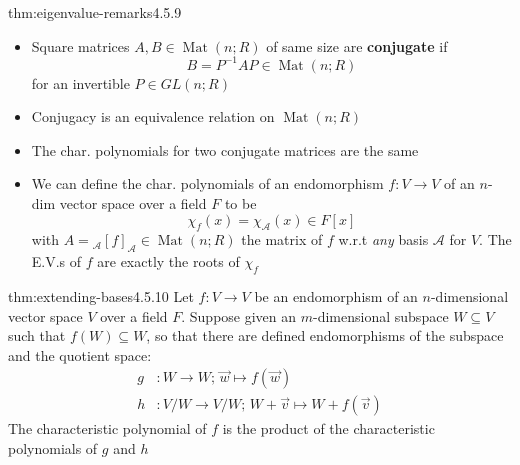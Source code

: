 \documentclass[landscape, 8pt]{extarticle}
\DeclareMathOperator{\Mat}{Mat}
\begin{document}
\begin{multicols}{3}
\newpage
\begin{thm}{thm:eigenvalue-remarks}{4.5.9}
    \begin{itemize}[leftmargin=*]
        \setlength\itemsep{0em}
        \item Square matrices $A, B\in \Mat(n;R)$ of same size are \textbf{conjugate} if
            \[B = P^{-1}AP\in \Mat(n; R)\]
            for an invertible $P\in GL(n;R)$
        \item Conjugacy is an equivalence relation on $\Mat(n;R)$
        \item The char. polynomials for two conjugate matrices are the same
        \item We can define the char. polynomials of an endomorphism $f : V\to V$ of an $n$-dim vector space over a field $F$ to be
            \[\chi_{f}(x) = \chi_{\mathcal{A}}(x)\in F[x]\]
            with $A = {}_{\mathcal{A}}[f]_{\mathcal{A}}\in \Mat(n;R)$ the matrix of $f$ w.r.t \textit{any} basis $\mathcal{A}$ for $V$. The E.V.s of $f$ are exactly the roots of $\chi_{f}$
    \end{itemize}
\end{thm}

\begin{thm}{thm:extending-bases}{4.5.10}
    Let $f : V\to V$ be an endomorphism of an $n$-dimensional vector space $V$ over a field $F$. Suppose given an $m$-dimensional subspace $W\subseteq V$ such that $f(W)\subseteq W$, so that there are defined endomorphisms of the subspace and the quotient space:
    \begin{align*}
        g &: W \to W;\, \vec{w}\mapsto f(\vec{w})\\
        h &: V / W \to V / W;\, W + \vec{v} \mapsto W + f(\vec{v})
    \end{align*}
    The characteristic polynomial of $f$ is the product of the characteristic polynomials of $g$ and $h$
\end{thm}


\end{multicols}
\end{document}
